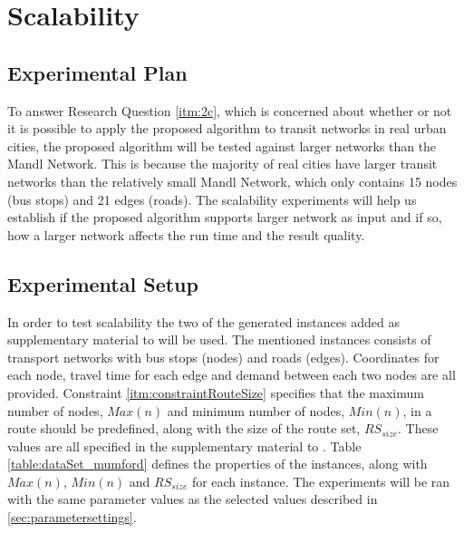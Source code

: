 \section{Scalability}

\subsection{Experimental Plan}
To answer Research Question \vref{itm:2c}, which is concerned about whether or not it is possible to apply the proposed algorithm to transit networks in real urban cities, the proposed algorithm will be tested against larger networks than the Mandl Network. This is because the majority of real cities have larger transit networks than the relatively small Mandl Network, which only contains 15 nodes (bus stops) and 21 edges (roads). The scalability experiments will help us establish if the proposed algorithm supports larger network as input and if so, how a larger network affects the run time and the result quality.


\subsection{Experimental Setup}
\label{subsec:scalabilityExperiments_setup}

In order to test scalability the two of the generated instances added as supplementary material to \citet{mumford13} will be used. The mentioned instances consists of transport networks with bus stops (nodes) and roads (edges). Coordinates for each node, travel time for each edge and demand between each two nodes are all provided. Constraint \vref{itm:constraintRouteSize} specifies that the maximum number of nodes, $Max(n)$ and minimum number of nodes, $Min(n)$, in a route should be predefined, along with the size of the route set, $RS_{size}$. These values are all specified in the supplementary material to \citet{mumford13}. Table \vref{table:dataSet_mumford} defines the properties of the instances, along with $Max(n)$, $Min(n)$ and $RS_{size}$ for each instance. The experiments will be ran with the same parameter values as the selected values described in \vref{sec:parametersettings}.


